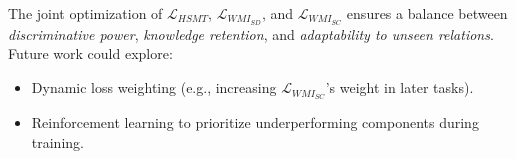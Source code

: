 
The joint optimization of $\mathcal{L}_{HSMT}$, $\mathcal{L}_{WMI_{SD}}$, and $\mathcal{L}_{WMI_{SC}}$ ensures a balance between \textit{discriminative power}, \textit{knowledge retention}, and \textit{adaptability to unseen relations}. Future work could explore:
\begin{itemize}
    \item Dynamic loss weighting (e.g., increasing $\mathcal{L}_{WMI_{SC}}$'s weight in later tasks).
    \item Reinforcement learning to prioritize underperforming components during training.
\end{itemize}
\label{sec:appendix_ablation1}







